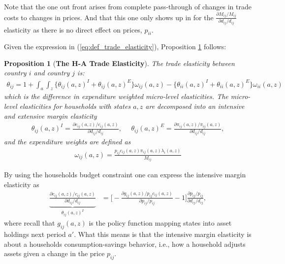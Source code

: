 \documentclass[12pt,pdftex]{article}
\newtheorem{prp}{Proposition}
\begin{document}
\begin{onehalfspacing}
Note that the one out front arises from complete pass-through of changes in trade costs to changes in prices. And that this one only shows up in for the $\frac{\partial  M_{ij} / M_{ij}}{\partial d_{ij} / d_{ij}} $ elasticity as there is no direct effect on prices, $p_{ii}$.

Given the expression in (\ref{eq:def_trade_elasticity}), Proposition \ref{apx-prp:GET} follows:
\begin{prp}[\textbf{The H-A Trade Elasticity}] \label{apx-prp:GET} The trade elasticity between country $i$ and country $j$ is:
{\footnotesize
\begin{align}
\theta_{ij} = 1 + \int_{a}\int_{z}  \bigg \{ \theta_{ij}(a,z)^{I} + \theta_{ij}(a,z)^{E} \bigg \}\omega_{ij}(a,z) - \bigg \{ \theta_{ii}(a,z)^{I} + \theta_{ii}(a,z)^{E} \bigg \}\omega_{ii}(a,z)
\label{eq:apx-trade-elasticity}
\end{align}
}which is the difference in expenditure weighted micro-level elasticities. The micro-level elasticities for households with states $a,z$ are decomposed into an intensive and extensive margin elasticity
{\footnotesize
\begin{align}
\nonumber
\theta_{ij}(a,z)^{I} = \frac{\partial c_{ij}(a,z)/ c_{ij}(a,z)}{\partial d_{ij} / d_{ij}}, \ \ \ \ \ \ \theta_{ij}(a,z)^{E} = \frac{\partial \pi_{ij}(a,z) / \pi_{ij}(a,z)}{\partial d_{ij} / d_{ij}},
\end{align}
}
and the expenditure weights are defined as
{\footnotesize
\begin{align}
\nonumber
\omega_{ij}(a,z) = \frac{p_{ij}c_{ij}(a,z)\pi_{ij}(a,z) \lambda_{i}(a,z)}{M_{ij}}
\end{align}
}
\end{prp}
By using the households budget constraint one can express the intensive margin elasticity as
\begin{align}
\underbrace{\frac{\partial c_{ij}(a,z)/ c_{ij}(a,z)}{\partial d_{ij} / d_{ij}}}_{\theta_{ij}(a,z)^{I}} &= \bigg [-\frac{\partial g_{ij}(a,z)/ p_{ij}c_{ij}(a,z)}{\partial p_{ij}/ p_{ij}} - 1 \bigg ]\frac{\partial p_{ij}/p_{ij}}{\partial d_{ij}/ d_{ij}} ,
\label{eq:apx-intensive-margin}
\end{align}
where recall that $g_{ij}(a,z)$ is the policy function mapping states into asset holdings next period $a'$. What this means is that the intensive margin elasticity is about a households consumption-savings behavior, i.e., how a household adjusts assets given a change in the price $p_{ij}$.


\end{onehalfspacing}
\end{document}
